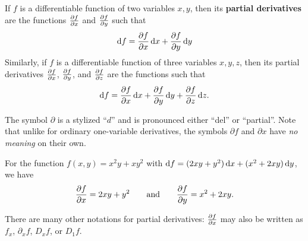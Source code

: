 \documentclass[12pt]{amsart}
\begin{document}
\begin{defn}
  If $f$ is a differentiable function of two variables $x,y$, then its \textbf{partial derivatives} are the functions $\frac{\partial f}{\partial x}$ and $\frac{\partial f}{\partial y}$ such that
  \[ \mathrm{d} f = \frac{\partial f}{\partial x}\,\mathrm{d} x + \frac{\partial f}{\partial y}\,\mathrm{d} y\]
  Similarly, if $f$ is a differentiable function of three variables $x,y,z$, then its partial derivatives $\frac{\partial f}{\partial x}$, $\frac{\partial f}{\partial y}$, and $\frac{\partial f}{\partial z}$ are the functions such that
  \[ \mathrm{d} f = \frac{\partial f}{\partial x}\,\mathrm{d} x + \frac{\partial f}{\partial y}\,\mathrm{d} y + \frac{\partial f}{\partial z}\,\mathrm{d} z.\]
\end{defn}

The symbol $\partial$ is a stylized ``$d$'' and is pronounced either ``del'' or ``partial''.
Note that unlike for ordinary one-variable derivatives, the symbols $\partial f$ and $\partial x$ have \emph{no meaning} on their own.

\begin{eg}
  For the function $f(x,y) = x^2y + xy^2$ with $\mathrm{d} f = (2xy + y^2)\,\mathrm{d} x + (x^2+2xy)\,\mathrm{d} y$, we have
  \begin{align*}
    \frac{\partial f}{\partial x} = 2xy + y^2 \qquad\text{and}\qquad
    \frac{\partial f}{\partial y} = x^2+2xy.
  \end{align*}
\end{eg}

There are many other notations for partial derivatives: $\frac{\partial f}{\partial x}$ may also be written as $f_x$, $\partial_x f$, $D_x f$, or $D_1 f$.

\end{document}
